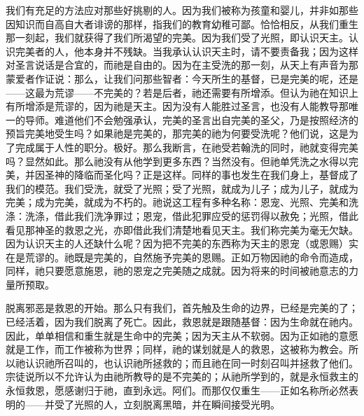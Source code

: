 我们有充足的方法应对那些好挑剔的人。因为我们被称为孩童和婴儿，并非如那些因知识而自高自大者诽谤的那样，指我们的教育幼稚可鄙。恰恰相反，从我们重生那一刻起，我们就获得了我们所渴望的完美。因为我们受了光照，即认识天主。认识完美者的人，他本身并不残缺。当我承认认识天主时，请不要责备我；因为这样对圣言说话是合宜的，而祂是自由的。因为在主受洗的那一刻，从天上有声音为那蒙爱者作证说：那么，让我们问那些智者：今天所生的基督，已是完美的呢，还是——这最为荒谬——不完美的？若是后者，祂还需要有所增添。但认为祂在知识上有所增添是荒谬的，因为祂是天主。因为没有人能胜过圣言，也没有人能教导那唯一的导师。难道他们不会勉强承认，完美的圣言出自完美的圣父，乃是按照经济的预旨完美地受生吗？如果祂是完美的，那完美的祂为何要受洗呢？他们说，这是为了完成属于人性的职分。极好。那么我断言，在祂受若翰洗的同时，祂就变得完美吗？显然如此。那么祂没有从他学到更多东西？当然没有。但祂单凭洗之水得以完美，并因圣神的降临而圣化吗？正是这样。同样的事也发生在我们身上，基督成了我们的模范。我们受洗，就受了光照；受了光照，就成为儿子；成为儿子，就成为完美；成为完美，就成为不朽的。祂说这工程有多种名称：恩宠、光照、完美和洗涤：洗涤，借此我们洗净罪过；恩宠，借此犯罪应受的惩罚得以赦免；光照，借此看见那神圣的救恩之光，亦即借此我们清楚地看见天主。我们称完美为毫无欠缺。因为认识天主的人还缺什么呢？因为把不完美的东西称为天主的恩宠（或恩赐）实在是荒谬的。祂既是完美的，自然施予完美的恩赐。正如万物因祂的命令而造成，同样，祂只要愿意施恩，祂的恩宠之完美随之成就。因为将来的时间被祂意志的力量所预取。\par

脱离邪恶是救恩的开始。那么只有我们，首先触及生命的边界，已经是完美的了；已经活着，因为我们脱离了死亡。因此，救恩就是跟随基督：因为生命就在祂内。因此，单单相信和重生就是生命中的完美；因为天主从不软弱。因为正如祂的意愿就是工作，而工作被称为世界；同样，祂的谋划就是人的救恩，这被称为教会。所以祂认识祂所召叫的，也认识祂所拯救的；而且祂在同一时刻召叫并拯救了他们。宗徒说所以不允许认为由祂所教导的是不完美的；从祂所学到的，就是永恒救主的永恒救恩，愿感谢归于祂，直到永远。阿们。而那仅仅重生——正如名称所必然表明的——并受了光照的人，立刻脱离黑暗，并在瞬间接受光明。\par

